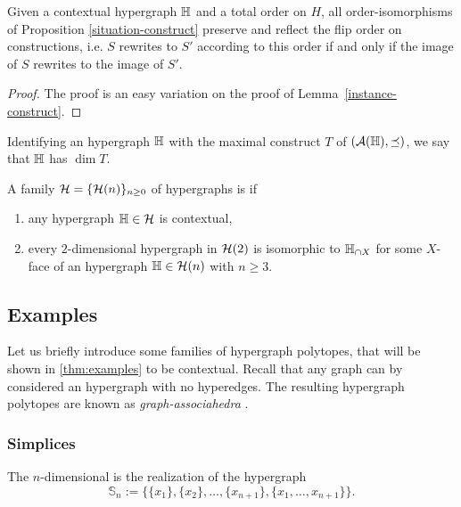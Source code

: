 \begin{proposition} Given a contextual hypergraph ${\mathbb H}$ and a total order on $H$, all order-isomorphisms
of
Proposition \ref{situation-construct} preserve and reflect the flip order on constructions, i.e.  $S$ rewrites to $S'$ according to this order if and only if the image of $S$ rewrites to the image of $S'$.
\end{proposition}

\begin{proof} The proof is an easy variation on the proof of Lemma~\ref{instance-construct}. 
\end{proof}

Identifying an hypergraph ${\mathbb H}$ with the maximal construct $T$ of $({\cal A}({\mathbb H}),\preceq)$, we say that ${\mathbb H}$ has  $\dim T$.

\begin{definition}
    A family $\mathcal{H}=\{\mathcal{H}(n)\}_{n\geq 0}$ of hypergraphs is  if 
    \begin{enumerate}
      \item any hypergraph ${\mathbb H} \in \mathcal{H}$ is contextual,
      \item every $2$-dimensional hypergraph in $\mathcal{H}(2)$ is isomorphic to ${\mathbb H}_{\cap X}$ for some $X$-face of an hypergraph ${\mathbb H} \in \mathcal{H}(n)$ with $n\geq 3$. 
    \end{enumerate}
\end{definition}


\subsection{Examples}
\label{ss:examples}

Let us briefly introduce some families of hypergraph polytopes, that will be shown in \cref{thm:examples} to be contextual. 
Recall that any graph can by considered an hypergraph with no hyperedges.
The resulting hypergraph polytopes are known as \emph{graph-associahedra} \cite{CD-CCGA}.

\subsubsection{Simplices}
The $n$-dimensional  is the realization of the hypergraph 
$$\mathbb{S}_n:=\{\{x_1\},\{x_2\},\ldots,\{x_{n+1}\},\{x_1,\ldots,x_{n+1}\}\}.$$

